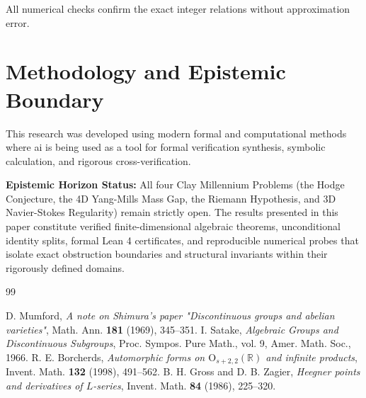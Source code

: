 \documentclass[11pt,a4paper]{article}
\theoremstyle{definition}
\begin{document}
\noindent All numerical checks confirm the exact integer relations without approximation error.


\section{Methodology and Epistemic Boundary}
\noindent This research was developed using modern formal and computational methods where ai is being used as a tool for formal verification synthesis, symbolic calculation, and rigorous cross-verification.

\vspace{0.5em}
\noindent\textbf{Epistemic Horizon Status:} All four Clay Millennium Problems (the Hodge Conjecture, the 4D Yang-Mills Mass Gap, the Riemann Hypothesis, and 3D Navier-Stokes Regularity) remain strictly open. The results presented in this paper constitute verified finite-dimensional algebraic theorems, unconditional identity splits, formal Lean 4 certificates, and reproducible numerical probes that isolate exact obstruction boundaries and structural invariants within their rigorously defined domains.

\begin{thebibliography}{99}

 D. Mumford, \emph{A note on Shimura's paper "Discontinuous groups and abelian varieties"}, Math. Ann. \textbf{181} (1969), 345--351.
 I. Satake, \emph{Algebraic Groups and Discontinuous Subgroups}, Proc. Sympos. Pure Math., vol. 9, Amer. Math. Soc., 1966.
 R. E. Borcherds, \emph{Automorphic forms on $\mathrm{O}_{s+2,2}(\mathbb{R})$ and infinite products}, Invent. Math. \textbf{132} (1998), 491--562.
 B. H. Gross and D. B. Zagier, \emph{Heegner points and derivatives of $L$-series}, Invent. Math. \textbf{84} (1986), 225--320.

\end{thebibliography}
\end{document}
